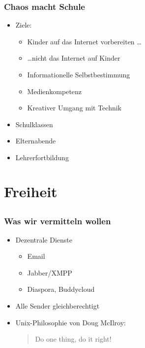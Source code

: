 \documentclass[14pt,handout]{beamer}
\begin{document}
\begin{frame}
    \frametitle{Chaos macht Schule}
    \begin{itemize}
        \item<2->Ziele:
            \begin{itemize}
                \item<3-> Kinder auf das Internet vorbereiten \ldots
                \item<4-> \ldots nicht das Internet auf Kinder
                \item<5-> Informationelle Selbstbestimmung
                \item<6-> Medienkompetenz
                \item<7-> Kreativer Umgang mit Technik
            \end{itemize}
        \item<8-> Schulklassen
        \item<9-> Elternabende
        \item<10-> Lehrerfortbildung
    \end{itemize}
\end{frame}

\section{Freiheit}
\subsection{}

\begin{frame}
    \frametitle{Was wir vermitteln wollen}
    \begin{itemize}
        \item<2-> Dezentrale Dienste
            \begin{itemize}
                \item<3-> Email
                \item<4-> Jabber/XMPP
                \item<5-> Diaspora, Buddycloud
            \end{itemize}
        \item<6-> Alle Sender gleichberechtigt
        \item<7-> Unix-Philosophie von Doug McIlroy:
            \begin{quote}Do one thing, do it right!
            \end{quote}
    \end{itemize}
\end{frame}
\end{document}
